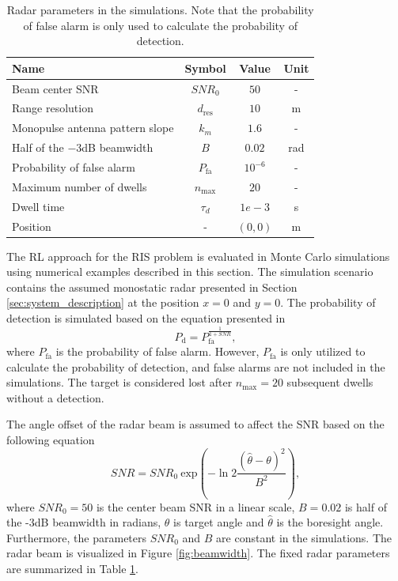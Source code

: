 \documentclass[english, 12pt, a4paper, elec, utf8, a-1b, online]{aaltothesis}
\numberwithin{equation}{section}
\newcommand{\sno}{SNR_0}
\renewcommand{\exp}[1]{\text{exp}\left( #1 \right)}
\newcommand{\nmax}{n_\text{max}}
\begin{document}
\bgroup
\def \arraystretch{1.25}
\begin{table}[tb]
    \centering
    \begin{tabular}{|l|c|c|c|}
    \hline
    \textbf{Name}              & \textbf{Symbol} & \textbf{Value}  & \textbf{Unit}\\ \hline
    Beam center SNR             & $\sno$          & $50$ & -          \\ \hline
    Range resolution            & $d_\text{res}$  & $10$ & m  \\ \hline
    Monopulse antenna pattern slope  & $k_m$      & $1.6$ & -  \\ \hline
    Half of the $-3$dB beamwidth & $B$             & $0.02$ & rad         \\ \hline
    Probability of false alarm & $P_\text{fa}$   & $10^{-6}$ & -      \\ \hline
    Maximum number of dwells   & $n_\text{max}$  & $20$ & -  \\ \hline
    Dwell time                 & $\tau_d$          & $1e-3$ & s   \\ \hline
    Position                   & -               & $(0, 0)$ & m \\ \hline
    \end{tabular}
    \caption{Radar parameters in the simulations. Note that the probability of false alarm is only used to calculate the probability of detection.}
    \label{tab:radar_parameters}
\end{table}
\egroup

The RL approach for the RIS problem is evaluated in Monte Carlo simulations using numerical examples described in this section.
The simulation scenario contains the assumed monostatic radar presented in Section \ref{sec:system_description} at the position $x=0$ and $y=0$. 
The probability of detection is simulated based on the equation presented in \cite{vanKeuk1993}
\begin{equation}\label{eq:singer_1_pd}
    P_\text{d} = P_\text{fa}^{\frac{1}{1+SNR}},
\end{equation}
where $P_\text{fa}$ is the probability of false alarm.
However, $P_\text{fa}$ is only utilized to calculate the probability of detection, and false alarms are not included in the simulations.
The target is considered lost after $\nmax=20$ subsequent dwells without a detection.

The angle offset of the radar beam is assumed to affect the SNR based on the following equation
\begin{equation} \label{eq:offset_snr}
    SNR = \sno~\exp{ - \ln{2}
        \frac
            {(\hat{\theta} - \theta)^2}
            {B^2}},
\end{equation}
where $\sno=50$ is the center beam SNR in a linear scale, $B=0.02$ is half of the -3dB beamwidth in radians, $\theta$ is target angle and $\hat{\theta} $ is the boresight angle. 
Furthermore, the parameters $\sno$ and $B$ are constant in the simulations. 
The radar beam is visualized in Figure \ref{fig:beamwidth}.
The fixed radar parameters are summarized in Table \ref{tab:radar_parameters}.
\end{document}
